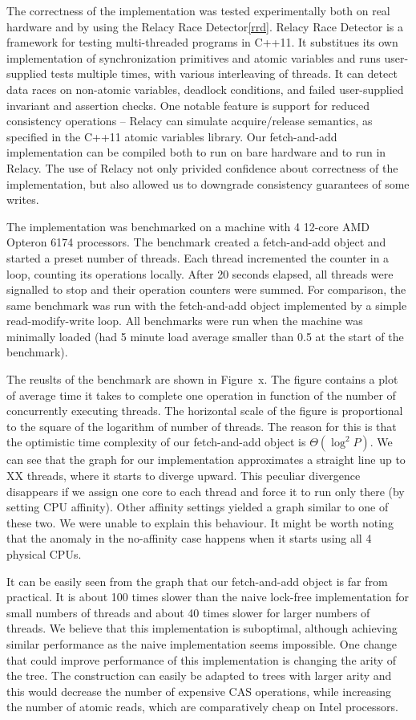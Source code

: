 \documentclass[a4paper,11pt]{article}
\begin{document}
The correctness of the implementation was tested experimentally both on real hardware and by using the Relacy Race Detector\ref{rrd}. Relacy Race Detector is a framework for testing multi-threaded programs in C++11.
It substitues its own
implementation of synchronization primitives and atomic variables and runs user-supplied tests multiple times, with various interleaving of threads.
It can detect data races on non-atomic variables, deadlock conditions, and failed user-supplied invariant and assertion
checks. One notable feature is support for reduced consistency operations -- Relacy can simulate acquire/release semantics, as specified in the C++11 atomic variables library.
Our fetch-and-add implementation can be compiled both to run on bare hardware and to run in Relacy. The use of Relacy not only privided confidence about correctness of the implementation, but also allowed us to downgrade
consistency guarantees of some writes.


The implementation was benchmarked on a machine with 4 12-core AMD Opteron 6174 processors.
The benchmark created a fetch-and-add object and started a preset number of threads. Each thread incremented the counter in a loop, counting its operations locally. After 20 seconds elapsed, all threads were signalled
to stop and their operation counters were summed. For comparison, the same benchmark was run with the fetch-and-add object implemented by a simple read-modify-write loop. All benchmarks were run when the machine was
minimally loaded (had 5 minute load average smaller than 0.5 at the start of the benchmark).

The reuslts of the benchmark are shown in Figure~x. The figure contains a plot of average time it takes to complete one operation in function of the number of concurrently executing threads.
The horizontal scale of the figure is proportional to the square of the logarithm of number of threads. The reason for this is that the optimistic time complexity
of our fetch-and-add object is $\Theta(\log^2 P)$. We can see that the graph for our implementation approximates a straight line up to XX threads, where it starts to diverge upward. This peculiar divergence disappears
if we assign one core to each thread and force it to run only there (by setting CPU affinity). Other affinity settings yielded a graph similar to one of these two. We were unable to explain this behaviour. It might
be worth noting that the anomaly in the no-affinity case happens when it starts using all 4 physical CPUs.

It can be easily seen from the graph that our fetch-and-add object is far from practical. It is about 100 times slower than the naive lock-free implementation for small numbers of threads and about 40 times slower
for larger numbers of threads. We believe that this implementation is suboptimal, although achieving similar performance as the naive implementation seems impossible. One change that could improve performance
of this implementation is changing the arity of the tree. The construction can easily be adapted to trees with larger arity and this would decrease the number of expensive CAS operations, while increasing the number
of atomic reads, which are comparatively cheap on Intel processors.
\end{document}
